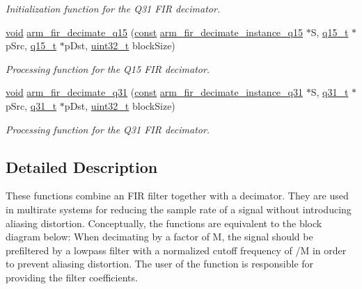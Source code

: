 \begin{DoxyCompactItemize}
\begin{DoxyCompactList}\small\item\em Initialization function for the Q31 F\-I\-R decimator. \end{DoxyCompactList}\item 
\hyperlink{group___n_a_m_e_ga18028b8badbf1ea7e704ccac3c488e82}{void} \hyperlink{group___f_i_r__decimate_gab8bef6d0f6a26fdbfce9485727713ce5}{arm\-\_\-fir\-\_\-decimate\-\_\-q15} (\hyperlink{group___n_a_m_e_ga7ae6d0e43244213b34de2c2b9aa30da6}{const} \hyperlink{structarm__fir__decimate__instance__q15}{arm\-\_\-fir\-\_\-decimate\-\_\-instance\-\_\-q15} $\ast$S, \hyperlink{arm__math_8h_ab5a8fb21a5b3b983d5f54f31614052ea}{q15\-\_\-t} $\ast$p\-Src, \hyperlink{arm__math_8h_ab5a8fb21a5b3b983d5f54f31614052ea}{q15\-\_\-t} $\ast$p\-Dst, \hyperlink{stdint_8h_a435d1572bf3f880d55459d9805097f62}{uint32\-\_\-t} block\-Size)
\begin{DoxyCompactList}\small\item\em Processing function for the Q15 F\-I\-R decimator. \end{DoxyCompactList}\item 
\hyperlink{group___n_a_m_e_ga18028b8badbf1ea7e704ccac3c488e82}{void} \hyperlink{group___f_i_r__decimate_gaef8e86add28f15fdc5ecc484e9dd7a4e}{arm\-\_\-fir\-\_\-decimate\-\_\-q31} (\hyperlink{group___n_a_m_e_ga7ae6d0e43244213b34de2c2b9aa30da6}{const} \hyperlink{structarm__fir__decimate__instance__q31}{arm\-\_\-fir\-\_\-decimate\-\_\-instance\-\_\-q31} $\ast$S, \hyperlink{arm__math_8h_adc89a3547f5324b7b3b95adec3806bc0}{q31\-\_\-t} $\ast$p\-Src, \hyperlink{arm__math_8h_adc89a3547f5324b7b3b95adec3806bc0}{q31\-\_\-t} $\ast$p\-Dst, \hyperlink{stdint_8h_a435d1572bf3f880d55459d9805097f62}{uint32\-\_\-t} block\-Size)
\begin{DoxyCompactList}\small\item\em Processing function for the Q31 F\-I\-R decimator. \end{DoxyCompactList}\end{DoxyCompactItemize}


\subsection{Detailed Description}
These functions combine an F\-I\-R filter together with a decimator. They are used in multirate systems for reducing the sample rate of a signal without introducing aliasing distortion. Conceptually, the functions are equivalent to the block diagram below\-:  When decimating by a factor of {\ttfamily M}, the signal should be prefiltered by a lowpass filter with a normalized cutoff frequency of {/\-M} in order to prevent aliasing distortion. The user of the function is responsible for providing the filter coefficients.

